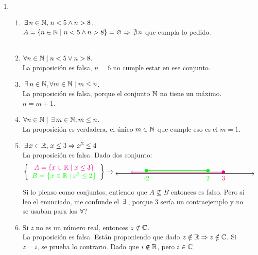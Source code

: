 \documentclass[12pt,a4paper, spanish]{article}
\begin{document}
\begin{enumerate}[label=\roman*)]
	\item
	      \begin{enumerate}[label=(\alph*)]
		      \item $\,\exists\, n \in \mathbb N,\, n < 5 \land n > 8$.\\
		            $A =  \left\{ n \in \mathbb N \;|\; n < 5 \land n > 8 \right\} = \varnothing \Rightarrow \,\nexists\, n$ que cumpla lo pedido.\\
		            \doceiiA \\

		      \item $\forall n \in \mathbb N \;|\; n < 5 \lor n > 8$.\\
		            La proposición es falsa, $n = 6$ no cumple estar en ese conjunto.

		      \item $\,\exists\, n \in \mathbb N, \forall m \in \mathbb N \;|\; m \leq n$.\\
		            La proposición es falsa, porque el conjunto $\mathbb N$ no tiene un máximo. $n = m+1$.

		      \item $\forall n \in \mathbb N \;|\; \,\exists\, m \in \mathbb N, m \leq n$.\\
		            La proposición es verdadera, el único $m \in \mathbb N$ que cumple eso es el $m = 1$.

		      \item $\,\exists\, x \in \mathbb R,\, x \leq 3 \Rightarrow x^2 \leq 4$.\\
		            La proposición es falsa. Dado dos conjunto:\\
		            \[
			            \llaves{c}{
			            \magenta{$A = \set{x \en \reales \talque x \leq 3}$} \\
			            {\color{green}B = \set{x \en \reales \talque x^2 \leq 2}}
			            } \to \doceiiE
		            \]
		            {
		            \color{red}Si lo pienso como conjuntos, entiendo que $A \nsubseteq B$ entonces es falso.
		            Pero si leo el enunciado, me confunde el $\,\exists\,$, porque 3 sería un contraejemplo
		            y no se usaban para los $\forall$?
		            }

		      \item Si $z$ no es un número real, entonces $z \notin \mathbb C$.\\
		            La proposición es falsa. Están proponiendo que dado $z \notin \mathbb R \Rightarrow z \notin \mathbb C$. Si $z = i$, se prueba lo contrario.
		            Dado que $i \notin \mathbb R$, pero  $i \in \mathbb C$
	      \end{enumerate}



\end{enumerate}
\end{document}
